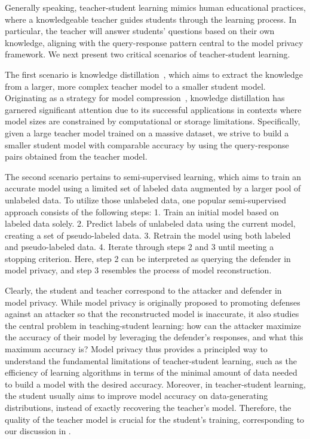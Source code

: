    Generally speaking, teacher-student learning mimics human educational practices, where a knowledgeable teacher guides students through the learning process. In particular, the teacher will answer students' questions based on their own knowledge, aligning with the query-response pattern central to the model privacy framework. We next present two critical scenarios of teacher-student learning.
   
    The first scenario is knowledge distillation~\citep{hinton2015distilling, phuong2019towards}, which aims to extract the knowledge from a larger, more complex teacher model to a smaller student model. Originating as a strategy for model compression~\citep{hoefler2021sparsity}, knowledge distillation has garnered significant attention due to its successful applications in contexts where model sizes are constrained by computational or storage limitations. Specifically, given a large teacher model trained on a massive dataset, we strive to build a smaller student model with comparable accuracy by using the query-response pairs obtained from the teacher model. 

    The second scenario pertains to semi-supervised learning, which aims to train an accurate model using a limited set of labeled data augmented by a larger pool of unlabeled data. 
    To utilize those unlabeled data, one popular semi-supervised approach consists of the following steps: 1. Train an initial model based on labeled data solely. 2. Predict labels of unlabeled data using the current model, creating a set of pseudo-labeled data. 3. Retrain the model using both labeled and pseudo-labeled data. 4. Iterate through steps 2 and 3 until meeting a stopping criterion. Here, step 2 can be interpreted as querying the defender in model privacy, and step 3 resembles the process of model reconstruction.

    Clearly, the student and teacher correspond to the attacker and defender in model privacy. While model privacy is originally proposed to promoting defenses against an attacker so that the reconstructed model is inaccurate, it also studies the central problem in teaching-student learning: how can the attacker maximize the accuracy of their model by leveraging the defender's responses, and what this maximum accuracy is?
    Model privacy thus provides a principled way to understand the fundamental limitations of teacher-student learning, such as the efficiency of learning algorithms in terms of the minimal amount of data needed to build a model with the desired accuracy. 
    Moreover, in teacher-student learning, the student usually aims to improve model accuracy on data-generating distributions, instead of exactly recovering the teacher's model. Therefore, the quality of the teacher model is crucial for the student's training, corresponding to our discussion in .
    


